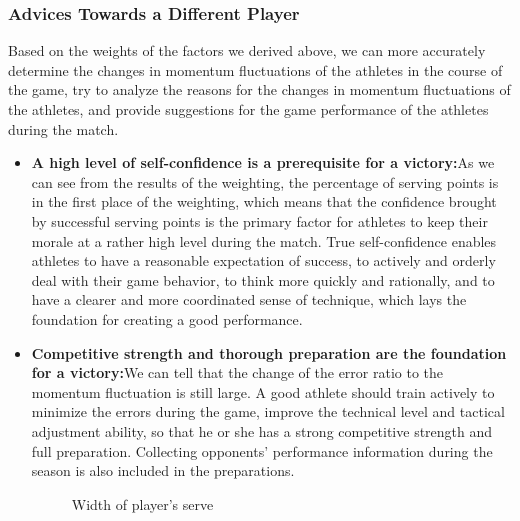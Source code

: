 \documentclass{mcmthesis}
\begin{document}
\subsubsection{Advices Towards a Different Player}
Based on the weights of the factors we derived above, we can more accurately determine the
changes in momentum fluctuations of the athletes in the course of the game, try to analyze the
reasons for the changes in momentum fluctuations of the athletes, and provide suggestions for the
game performance of the athletes during the match.\\
\begin{itemize}
    \item {\bf A high level of self-confidence is a prerequisite for a victory:}As we can see from the
    results of the weighting, the percentage of serving points is in the first place of the weighting, which means that the confidence brought by successful serving points is the primary factor for
    athletes to keep their morale at a rather high level during the match. True self-confidence enables
    athletes to have a reasonable expectation of success, to actively and orderly deal with their game
    behavior, to think more quickly and rationally, and to have a clearer and more coordinated sense of
    technique, which lays the foundation for creating a good performance.\\
    \item {\bf Competitive strength and thorough preparation are the foundation for a victory:}We
    can tell that the change of the error ratio to the momentum fluctuation is still large. A good athlete
    should train actively to minimize the errors during the game, improve the technical level and
    tactical adjustment ability, so that he or she has a strong competitive strength and full preparation. Collecting opponents’ performance information during the season is also included in the
    preparations.\\

    \begin{figure}[htbp]
        \centering
        \caption{Width of player's serve} \label{Figure 22-23}
    \end{figure}


\end{itemize}
\end{document}
